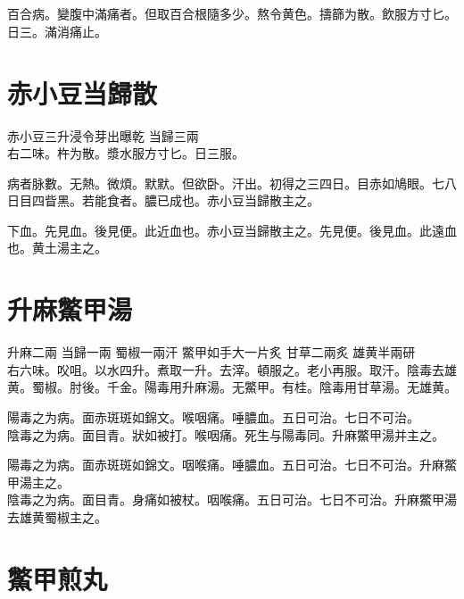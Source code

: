 \section{}

百合病。變腹中滿痛者。但取百合根隨多少。熬令黄色。擣篩为散。飲服方寸匕。日三。滿消痛止。

\section{赤小豆当歸散}

赤小豆{\scriptsize 三升浸令芽出曝乾} 当歸{\scriptsize 三兩}\\
右二味。杵为散。漿水服方寸匕。日三服。

病者脉數。无熱。微煩。默默。但欲卧。汗出。初得之三四日。目赤如鳩眼。七八日目四眥黑。若能食者。膿已成也。赤{\khaaitp 小}豆当歸散主之。

下血。先見血。後見便。此近血也。赤小豆当歸散主之。先見便。後見血。此遠血也。黄土湯主之。

\section{升麻鱉甲湯}

升麻{\scriptsize 二兩} 当歸{\scriptsize 一兩} 蜀椒{\scriptsize 一兩汗} 鱉甲{\scriptsize 如手大一片炙} 甘草{\scriptsize 二兩炙} 雄黄{\scriptsize 半兩研}\\
右六味。㕮咀。以水四升。煮取一升。去滓。頓服之。老小再服。取汗。陰毒去雄黄。蜀椒。{\scriptsize 肘後。千金。陽毒用升麻湯。无鱉甲。有桂。陰毒用甘草湯。无雄黄。}

陽毒之为病。面赤斑斑如錦文。喉咽痛。唾膿血。五日可治。七日不可治。\\
陰毒之为病。面目青。狀如被打。喉咽痛。死生与陽毒同。升麻鱉甲湯并主之。{\wuben}

陽毒之为病。面赤斑斑如錦文。咽喉痛。唾膿血。五日可治。七日不可治。升麻鱉甲湯主之。\\
陰毒之为病。面目青。身痛如被杖。咽喉痛。五日可治。七日不可治。升麻鱉甲湯去雄黄蜀椒主之。{\dengben}


\section{鱉甲煎丸}

